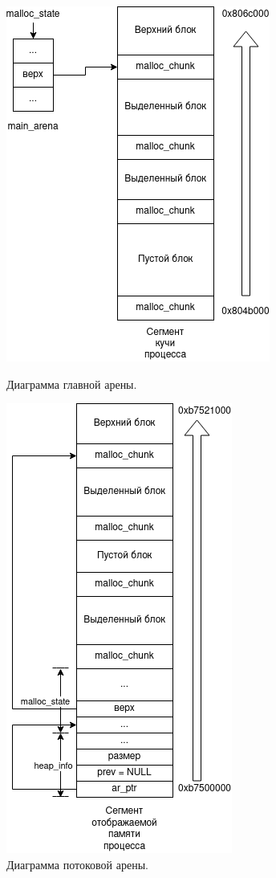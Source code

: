 \begin{figure}[!h]
	\begin{minipage}{0.5\textwidth}
		\includegraphics[scale=0.5]{images/glibc-malloc-main-arena.png}
		\caption{Диаграмма главной арены.}
		\label{glibc-malloc-main-arena}
	\end{minipage}
	\begin{minipage}{0.5\textwidth}
		\includegraphics[scale=0.4]{images/glibc-malloc-thread-arena.png}
		\caption{Диаграмма потоковой арены.}
		\label{glibc-malloc-thread-arena}
	\end{minipage}
\end{figure}

